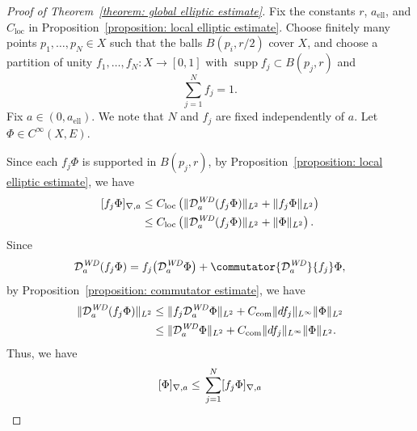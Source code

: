 \documentclass[a4paper,oneside,12pt]{amsart}
\theoremstyle{plain}
\theoremstyle{definition}
\theoremstyle{remark}
\DeclarePairedDelimiter{\norm}{\lVert}{\rVert}
\DeclarePairedDelimiter{\seminorm}{\lbrack}{\rbrack}
\DeclareMathOperator{\support}{supp}
\newcommand{\Ltwonorm}[2][L^2]{\norm{#2}_{#1}}
\newcommand{\mesoscopicdifferenceseminorm}[2][a]{\seminorm{#2}_{\nabla,#1}}
\newcommand{\mesoscopicWilsonDiracoperator}[1][a]{\mathcal{D}_{#1}^{\mathit{WD}}}
\newcommand{\constantlocal}{C_{\mathrm{loc}}}
\newcommand{\constantcommutator}{C_{\mathrm{com}}}
\newcommand{\constantAell}{a_{\mathrm{ell}}}
\begin{document}
\begin{proof}[Proof of Theorem~\ref{theorem: global elliptic estimate}]
  Fix the constants $r$, $\constantAell$, and $\constantlocal$ in Proposition~\ref{proposition: local elliptic estimate}.
  Choose finitely many points $p_1, \dots, p_N \in X$ such that the balls $B(p_i, r/2)$ cover $X$, and choose a partition of unity $f_1, \dots, f_N \colon X \to [0,1]$ with $\support f_j \subset B(p_j,r)$ and
  \begin{equation}
    \sum_{j=1}^N f_j = 1.
  \end{equation}
  Fix $a \in (0,\constantAell)$.
  We note that $N$ and $f_j$ are fixed independently of $a$.
  Let $\Phi \in C^{\infty}(X,E)$.

  Since each $f_j \Phi$ is supported in $B(p_j,r)$, by Proposition~\ref{proposition: local elliptic estimate}, we have
  \begin{equation}
    \begin{aligned}
    \mesoscopicdifferenceseminorm{f_j \Phi} \le{}& \constantlocal \left( \Ltwonorm{\mesoscopicWilsonDiracoperator(f_j \Phi)} + \Ltwonorm{f_j\Phi} \right) \\
    \le{}& \constantlocal \left( \Ltwonorm{\mesoscopicWilsonDiracoperator(f_j \Phi)} + \Ltwonorm{\Phi} \right).
    \end{aligned}
  \end{equation}
  Since
  \begin{equation}
    \mesoscopicWilsonDiracoperator(f_j \Phi) = f_j \big(\mesoscopicWilsonDiracoperator \Phi\big) + \commutator{\mesoscopicWilsonDiracoperator}{f_j} \Phi,
  \end{equation}
  by Proposition~\ref{proposition: commutator estimate}, we have
  \begin{equation}
    \begin{aligned}
    \Ltwonorm{\mesoscopicWilsonDiracoperator(f_j \Phi)} \le{}& \Ltwonorm{f_j \mesoscopicWilsonDiracoperator \Phi} + \constantcommutator \norm{df_j}_{L^{\infty}} \Ltwonorm{\Phi} \\
      \le{}& \Ltwonorm{\mesoscopicWilsonDiracoperator \Phi} + \constantcommutator \norm{df_j}_{L^{\infty}} \Ltwonorm{\Phi}.
    \end{aligned}
  \end{equation}
  Thus, we have
  \begin{equation}
    \begin{aligned}
    \mesoscopicdifferenceseminorm{\Phi} \le{}& \sum_{j=1}^N \mesoscopicdifferenceseminorm{f_j \Phi} \\

\end{aligned}
\end{equation}
\end{proof}
\end{document}
